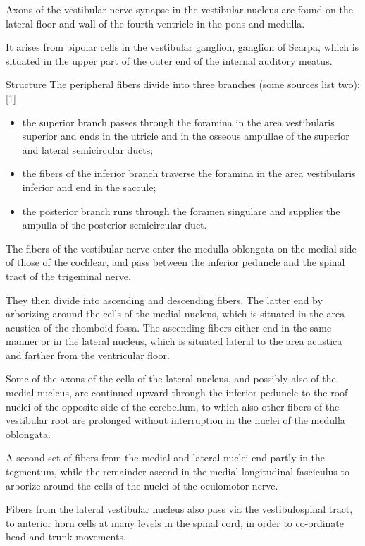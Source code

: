 Axons of the vestibular nerve synapse in the vestibular nucleus are found on the lateral floor and wall of the fourth ventricle in the pons and medulla.

It arises from bipolar cells in the vestibular ganglion, ganglion of Scarpa, which is situated in the upper part of the outer end of the internal auditory meatus.

Structure The peripheral fibers divide into three branches (some sources list two):{[}1{]}

\begin{itemize}
\tightlist
\item
  the superior branch passes through the foramina in the area vestibularis superior and ends in the utricle and in the osseous ampullae of the superior and lateral semicircular ducts;
\item
  the fibers of the inferior branch traverse the foramina in the area vestibularis inferior and end in the saccule;
\item
  the posterior branch runs through the foramen singulare and supplies the ampulla of the posterior semicircular duct.
\end{itemize}

The fibers of the vestibular nerve enter the medulla oblongata on the medial side of those of the cochlear, and pass between the inferior peduncle and the spinal tract of the trigeminal nerve.

They then divide into ascending and descending fibers. The latter end by arborizing around the cells of the medial nucleus, which is situated in the area acustica of the rhomboid fossa. The ascending fibers either end in the same manner or in the lateral nucleus, which is situated lateral to the area acustica and farther from the ventricular floor.

Some of the axons of the cells of the lateral nucleus, and possibly also of the medial nucleus, are continued upward through the inferior peduncle to the roof nuclei of the opposite side of the cerebellum, to which also other fibers of the vestibular root are prolonged without interruption in the nuclei of the medulla oblongata.

A second set of fibers from the medial and lateral nuclei end partly in the tegmentum, while the remainder ascend in the medial longitudinal fasciculus to arborize around the cells of the nuclei of the oculomotor nerve.

Fibers from the lateral vestibular nucleus also pass via the vestibulospinal tract, to anterior horn cells at many levels in the spinal cord, in order to co-ordinate head and trunk movements.

